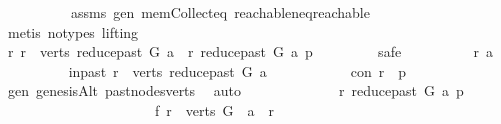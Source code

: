 \begin{isabellebody}
\ \ \ \ \ \ \ \ \ \ assms{\isacharparenleft}{\kern0pt}{}{\isacharparenright}{\kern0pt}\ gen\ mem{\isacharunderscore}{\kern0pt}Collect{\isacharunderscore}{\kern0pt}eq\ reachable{\isacharunderscore}{\kern0pt}neq{\isacharunderscore}{\kern0pt}reachable{}\isanewline
\ \ \ \ \ \ \ \ \isamarkupfalse%
\ {\isacharparenleft}{\kern0pt}metis\ {\isacharparenleft}{\kern0pt}no{\isacharunderscore}{\kern0pt}types{\isacharcomma}{\kern0pt}\ lifting{\isacharparenright}{\kern0pt}{\isacharparenright}{\kern0pt}\ \isanewline
\isanewline
\ \ \ \ \isamarkupfalse%
\ \ \ \ \isanewline
\ \ \ \ \ \ \isamarkupfalse%
\ {\isachardoublequoteopen}{\isasymforall}r{\isachardot}{\kern0pt}\ r\ {\isasymin}\ verts\ {\isacharparenleft}{\kern0pt}reduce{\isacharunderscore}{\kern0pt}past\ G\ a{\isacharparenright}{\kern0pt}\ {\isasymlongrightarrow}\ r\ {\isasymrightarrow}\isactrlsup {\isacharasterisk}{\kern0pt}\isactrlbsub reduce{\isacharunderscore}{\kern0pt}past\ G\ a\isactrlesub \ p{\isachardoublequoteclose}\ \isanewline
\ \ \ \ \ \ \isamarkupfalse%
\ safe\isanewline
\ \ \ \ \ \ \ \ \isamarkupfalse%
\ r\ a\isanewline
\ \ \ \ \ \ \ \ \isamarkupfalse%
\ in{\isacharunderscore}{\kern0pt}past{\isacharcolon}{\kern0pt}\ {\isachardoublequoteopen}r\ {\isasymin}\ verts\ {\isacharparenleft}{\kern0pt}reduce{\isacharunderscore}{\kern0pt}past\ G\ a{\isacharparenright}{\kern0pt}{\isachardoublequoteclose}\isanewline
\ \ \ \ \ \ \ \ \isamarkupfalse%
\ \isamarkupfalse%
\ con{\isacharcolon}{\kern0pt}\ {\isachardoublequoteopen}r\ {\isasymrightarrow}\isactrlsup {\isacharasterisk}{\kern0pt}\ p{\isachardoublequoteclose}\ \isamarkupfalse%
\ gen\ genesisAlt\ past{\isacharunderscore}{\kern0pt}nodes{\isacharunderscore}{\kern0pt}verts\ \isamarkupfalse%
\ auto\ \ \isanewline
\ \ \ \ \ \ \ \ \isamarkupfalse%
\ \isamarkupfalse%
\ {\isachardoublequoteopen}r\ {\isasymrightarrow}\isactrlsup {\isacharasterisk}{\kern0pt}\isactrlbsub reduce{\isacharunderscore}{\kern0pt}past\ G\ a\isactrlesub \ p{\isachardoublequoteclose}\isanewline
\ \ \ \ \ \ \ \ \isamarkupfalse%
\ {\isacharminus}{\kern0pt}\isanewline
\ \ \ \ \ \ \ \ \ \ \isamarkupfalse%
\ f{}{\isacharcolon}{\kern0pt}\ {\isachardoublequoteopen}r\ {\isasymin}\ verts\ G\ {\isasymand}\ a\ {\isasymrightarrow}\isactrlsup {\isacharplus}{\kern0pt}\ r{\isachardoublequoteclose}\isanewline
\ \ \ \ \ \ \ \ \ \ \ \ \isamarkupfalse%

\end{isabellebody}

